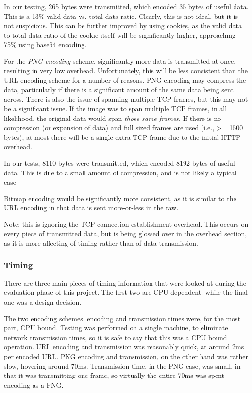 In our testing, 265 bytes were transmitted, which encoded 35 bytes of useful data. This is a 13\% valid data vs. total data ratio. Clearly, this is not ideal, but it is not suspicious. This can be further improved by using cookies, as the valid data to total data ratio of the cookie itself will be significantly higher, approaching 75\% using base64 encoding.

For the \emph{PNG encoding} scheme, significantly more data is transmitted at once, resulting in very low overhead. Unfortunately, this will be less consistent than the URL encoding scheme for a number of reasons. PNG encoding may compress the data, particularly if there is a significant amount of the same data being sent across. There is also the issue of spanning multiple TCP frames, but this may not be a significant issue. If the image was to span multiple TCP frames, in all likelihood, the original data would span \emph{those same frames}. If there is no compression (or expansion of data) and full sized frames are used (i.e., >= 1500 bytes), at most there will be a single extra TCP frame due to the initial HTTP overhead.

In our tests, 8110 bytes were transmitted, which encoded 8192 bytes of useful data. This is due to a small amount of compression, and is not likely a typical case.  

Bitmap encoding would be significantly more consistent, as it is similar to the URL encoding in that data is sent more-or-less in the raw.
	
Note: this is ignoring the TCP connection establishment overhead. This occurs on every piece of transmitted data, but is being glossed over in the overhead section, as it is more affecting of timing rather than of data transmission. 

\subsubsection{Timing}
There are three main pieces of timing information that were looked at during the evaluation phase of this project. The first two are CPU dependent, while the final one was a design decision. 

The two encoding schemes' encoding and transmission times were, for the most part, CPU bound. Testing was performed on a single machine, to eliminate network transmission times, so it is safe to say that this was a CPU bound operation. URL encoding and transmission was reasonably quick, at around 2ms per encoded URL. PNG encoding and transmission, on the other hand was rather slow, hovering around 70ms. Transmission time, in the PNG case, was small, in that it was transmitting one frame, so virtually the entire 70ms was spent encoding as a PNG.

